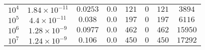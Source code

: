 \begin{tabular}{l c c c c c c c}
$10^4$  &  $1.84 \times 10^{-11}$  &  $0.0253$  &  $0.0$  &  $121$  &  $0$  &  $121$  &  $3894$  \\ 
$10^5$  &  $4.4 \times 10^{-11}$  &  $0.038$  &  $0.0$  &  $197$  &  $0$  &  $197$  &  $6116$  \\ 
$10^6$  &  $1.28 \times 10^{-9}$  &  $0.0977$  &  $0.0$  &  $462$  &  $0$  &  $462$  &  $15950$  \\ 
$10^7$  &  $1.24 \times 10^{-9}$  &  $0.106$  &  $0.0$  &  $450$  &  $0$  &  $450$  &  $17292$  \\ 
\hline \hline
\end{tabular}
